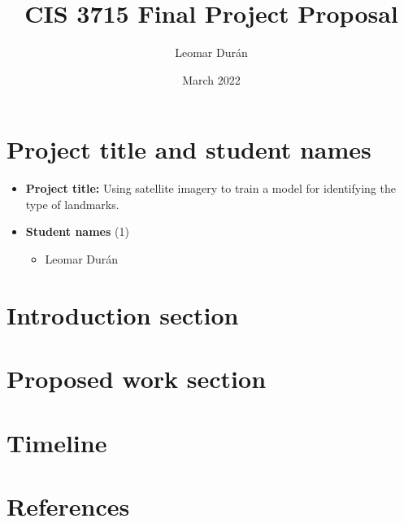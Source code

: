 \documentclass[11pt]{article}
\title{CIS 3715 Final Project Proposal}
\author{Leomar Durán}
\date{March 2022}
\begin{document}
\section{Project title and student names}
\begin{itemize}
    \item
        \textbf{Project title:} Using satellite imagery to train a model for identifying the type of landmarks.
    \item
        \textbf{Student names} (1)
        \begin{itemize}
            \item
                Leomar Durán
        \end{itemize}
\end{itemize}

\section{Introduction section}

\section{Proposed work section}
\section{Timeline}
\section{References}
\end{document}
